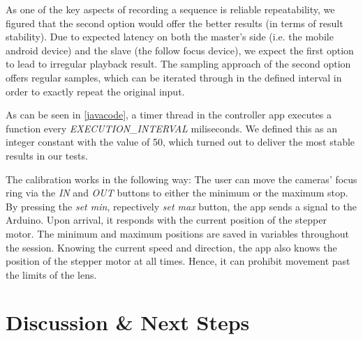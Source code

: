 \documentclass{sigchi}
\begin{document}
As one of the key aspects of recording a sequence is reliable repeatability, we figured that the second option would offer the better results (in terms of result stability). Due to expected latency on both the master's side (i.e. the mobile android device) and the slave (the follow focus device), we expect the first option to lead to irregular playback result. \newline
The sampling approach of the second option offers regular samples, which can be iterated through in the defined interval in order to exactly repeat the original input.



As can be seen in \autoref{javacode}, a timer thread in the controller app executes a function every \textit{EXECUTION\_INTERVAL} miliseconds. We defined this as an integer constant with the value of 50, which turned out to deliver the most stable results in our tests. 

The calibration works in the following way: The user can move the cameras' focus ring via the \textit{IN} and \textit{OUT} buttons to either the minimum or the maximum stop. By pressing the \textit{set min}, repectively \textit{set max} button, the app sends a signal to the Arduino. Upon arrival, it responds with the current position of the stepper motor. The minimum and maximum positions are saved in variables throughout the session. Knowing the current speed and direction, the app also knows the position of the stepper motor at all times. Hence, it can prohibit movement past the limits of the lens.


\section{Discussion \& Next Steps}
\end{document}
